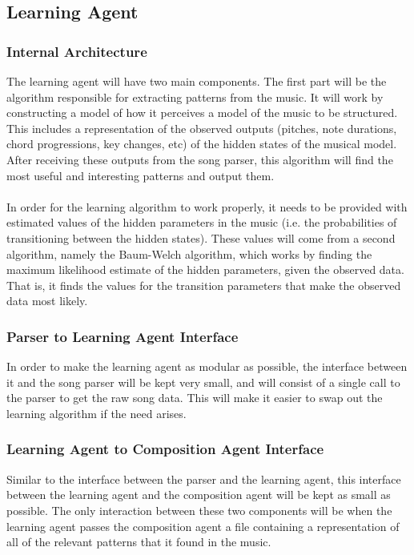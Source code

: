 \documentclass{article}
\begin{document}
\subsection{Learning Agent}
\subsubsection{Internal Architecture}
The learning agent will have two main components. The first part will be the algorithm responsible for extracting patterns from the music. It will work by constructing a model of how it perceives a model of the music to be structured. This includes a representation of the observed outputs (pitches, note durations, chord progressions, key changes, etc) of the hidden states of the musical model. After receiving these outputs from the song parser, this algorithm will find the most useful and interesting patterns and output them.\\
\\
In order for the learning algorithm to work properly, it needs to be provided with estimated values of the hidden parameters in the music (i.e. the probabilities of transitioning between the hidden states). These values will come from a second algorithm, namely the Baum-Welch algorithm, which works by finding the maximum likelihood estimate of the hidden parameters, given the observed data. That is, it finds the values for the transition parameters that make the observed data most likely. 

\subsubsection{Parser to Learning Agent Interface}
In order to make the learning agent as modular as possible, the interface between it and the song parser will be kept very small, and will consist of a single call to the parser to get the raw song data. This will make it easier to swap out the learning algorithm if the need arises.

\subsubsection{Learning Agent to Composition Agent Interface}
Similar to the interface between the parser and the learning agent, this interface between the learning agent and the composition agent will be kept as small as possible. The only interaction between these two components will be when the learning agent passes the composition agent a file containing a representation of all of the relevant patterns that it found in the music.
\end{document}
